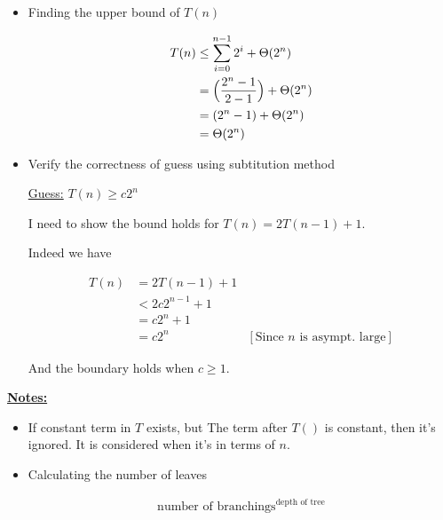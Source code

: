 \documentclass[12pt]{article}
\begin{document}
\begin{enumerate}[1.]
\begin{itemize}
        \bigskip

        \item Finding the upper bound of $T(n)$

        \begin{align}
            T(n) &\leq \sum\limits_{i=0}^{n-1} 2^i + \Theta(2^n)\\
            &= \Bigl( \frac{2^n - 1}{2 - 1} \Bigr) + \Theta(2^n)\\
            &= (2^n - 1) + \Theta(2^n)\\
            &= \Theta(2^n)
        \end{align}

        \item Verify the correctness of guess using subtitution method

        \bigskip

        \underline{Guess:} $T(n) \geq c2^n$

        \bigskip

        I need to show the bound holds for $T(n) = 2T(n - 1) + 1$.

        \bigskip

        Indeed we have

        \begin{align}
            T(n) &= 2T(n - 1) + 1\\
            &< 2c 2^{n-1} + 1\\
            &= c2^n + 1\\
            &= c2^n & [\text{Since $n$ is asympt. large}]
        \end{align}

        \bigskip

        And the boundary holds when $c \geq 1$.

    \end{itemize}

    \bigskip

    \underline{\textbf{Notes:}}

    \bigskip

    \begin{itemize}
        \item If constant term in $T$ exists, but The term after $T()$ is constant,
        then it's ignored. It is considered when it's in terms of $n$.

        \item Calculating the number of leaves

        \bigskip

        \begin{align}
            \text{number of branchings}^{\text{depth of tree}}
        \end{align}


\end{itemize}
\end{enumerate}
\end{document}
